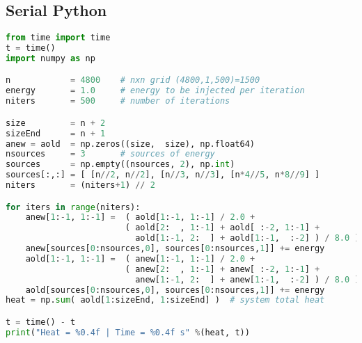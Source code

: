 \subsection{Serial Python}
\begin{lstlisting}[language=Python, caption={Serial Python implementation of the stencil test case.}]
from time import time
t = time()
import numpy as np

n            = 4800    # nxn grid (4800,1,500)=1500
energy       = 1.0     # energy to be injected per iteration
niters       = 500     # number of iterations

size         = n + 2
sizeEnd      = n + 1
anew = aold  = np.zeros((size,  size), np.float64)
nsources     = 3       # sources of energy
sources      = np.empty((nsources, 2), np.int)
sources[:,:] = [ [n//2, n//2], [n//3, n//3], [n*4//5, n*8//9] ]
niters       = (niters+1) // 2

for iters in range(niters):
    anew[1:-1, 1:-1] =  ( aold[1:-1, 1:-1] / 2.0 + 
                        ( aold[2:  , 1:-1] + aold[ :-2, 1:-1] +
                          aold[1:-1, 2:  ] + aold[1:-1,  :-2] ) / 8.0 )
    anew[sources[0:nsources,0], sources[0:nsources,1]] += energy     
    aold[1:-1, 1:-1] =  ( anew[1:-1, 1:-1] / 2.0 +
                        ( anew[2:  , 1:-1] + anew[ :-2, 1:-1] +
                          anew[1:-1, 2:  ] + anew[1:-1,  :-2] ) / 8.0 )
    aold[sources[0:nsources,0], sources[0:nsources,1]] += energy   
heat = np.sum( aold[1:sizeEnd, 1:sizeEnd] )  # system total heat

t = time() - t
print("Heat = %0.4f | Time = %0.4f s" %(heat, t))
\end{lstlisting}




